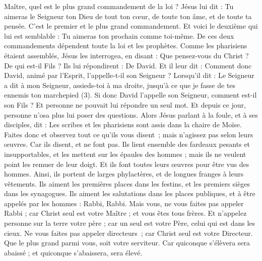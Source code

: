 \begin{multicols}{2}
{Maître, quel est le plus grand commandement de la loi ?
Jésus lui dit : Tu aimeras le Seigneur ton Dieu de tout ton cœur, de toute ton âme, et de toute ta pensée.
C’est le premier et le plus grand commandement.
Et voici le deuxième qui lui est semblable : Tu aimeras ton prochain comme toi-même.
De ces deux commandements dépendent toute la loi et les prophètes.
Comme les pharisiens étaient assemblés, Jésus les interrogea,
en disant : Que pensez-vous du Christ ? De qui est-il Fils ? Ils lui répondirent : De David.
Et il leur dit : Comment donc David, animé par l'Esprit, l'appelle-t-il son Seigneur ? Lorsqu’il dit :
Le Seigneur a dit à mon Seigneur, assieds-toi à ma droite, jusqu'à ce que je fasse de tes ennemis ton marchepied (3).
Si donc David l'appelle son Seigneur, comment est-il son Fils ?
Et personne ne pouvait lui répondre un seul mot. Et depuis ce jour, personne n'osa plus lui poser des questions.
\VerseOne{}Alors Jésus parlant à la foule, et à ses disciples,
dit : Les scribes et les pharisiens sont assis dans la chaire de Moïse.
Faites donc et observez tout ce qu’ils vous disent ; mais n’agissez pas selon leurs œuvres. Car ils disent, et ne font pas.
Ils lient ensemble des fardeaux pesants et insupportables, et les mettent sur les épaules des hommes ; mais ils ne veulent point les remuer de leur doigt.
Et ils font toutes leurs œuvres pour être vus des hommes. Ainsi, ils portent de larges phylactères, et de longues franges à leurs vêtements.
Ils aiment les premières places dans les festins, et les premiers sièges dans les synagogues.
Ils aiment les salutations dans les places publiques, et à être appelés par les hommes : Rabbi, Rabbi.
Mais vous, ne vous faites pas appeler Rabbi ; car Christ seul est votre Maître ; et vous êtes tous frères.
Et n'appelez personne sur la terre votre père ; car un seul est votre Père, celui qui est dans les cieux.
Ne vous faites pas appeler directeurs ; car Christ seul est votre Directeur.
Que le plus grand parmi vous, soit votre serviteur.
Car quiconque s'élèvera sera abaissé ; et quiconque s'abaissera, sera élevé.
}
\end{multicols}
